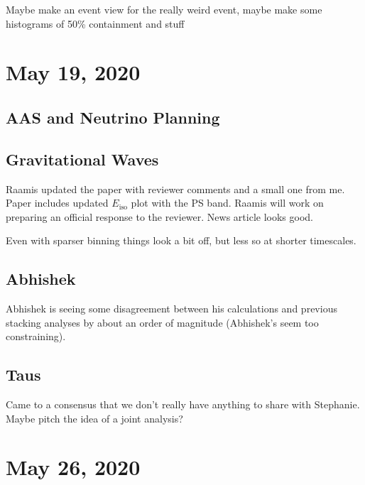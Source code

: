 Maybe make an event view for the really weird event, maybe make some histograms of 50\% containment and stuff

\chapter{May 19, 2020}
\section{AAS and Neutrino Planning}

\section{Gravitational Waves}
Raamis updated the paper with reviewer comments and a small one from me. Paper includes updated $E_{\mathrm{iso}}$ plot with the PS band. Raamis will work on preparing an official response to the reviewer. News article looks good.

Even with sparser binning things look a bit off, but less so at shorter timescales.

\section{Abhishek}
Abhishek is seeing some disagreement between his calculations and previous stacking analyses by about an order of magnitude (Abhishek's seem too constraining).

\section{Taus}
Came to a consensus that we don't really have anything to share with Stephanie. Maybe pitch the idea of a joint analysis?

\chapter{May 26, 2020}
